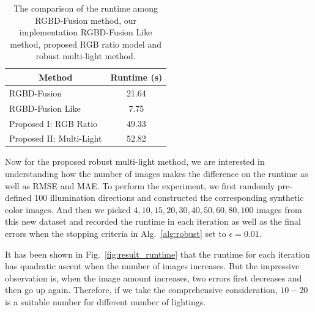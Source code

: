 \begin{table}[!ht]
\caption{The comparison of the runtime among RGBD-Fusion method, our implementation RGBD-Fusion Like method,  proposed RGB ratio model and robust multi-light method.}
\label{tab:runtime}
\centering
\begin{tabular}{|m{4cm} |m{7cm}|}
\hline
\multicolumn{1}{|c|}{Method}                               & \multicolumn{1}{c|}{Runtime (s)}                                                                                                                 \\ \hline
RGBD-Fusion~\cite{or2015rgbd} & \multicolumn{1}{c|}{21.64}             \\ \hline
RGBD-Fusion Like                     & \multicolumn{1}{c|}{7.75}      \\ \hline
Proposed I: RGB Ratio                            & \multicolumn{1}{c|}{49.33}        \\ \hline
Proposed II: Multi-Light                        & \multicolumn{1}{c|}{52.82}\\ \hline
\end{tabular}
\end{table}

Now for the proposed robust multi-light method, we are interested in understanding how the number of  images makes the difference on the runtime as well as RMSE and MAE.
To perform the experiment, we first randomly pre-defined 100 illumination directions and constructed the corresponding synthetic color images.
And then we picked $4, 10, 15, 20, 30, 40, 50, 60, 80, 100$ images from this new dataset and recorded the runtime in each iteration as well as the final errors when the stopping criteria in Alg.~\ref{alg:robust} set to $\epsilon = 0.01$.

It has been shown in Fig.~\ref{fig:result_runtime} that the runtime for each iteration has quadratic ascent when the number of images increases.
But the impressive observation is, when the image amount increases, two errors first decreases and then go up again. 
Therefore, if we take the comprehensive consideration, $10-20$ is a suitable number for different number of lightings.

